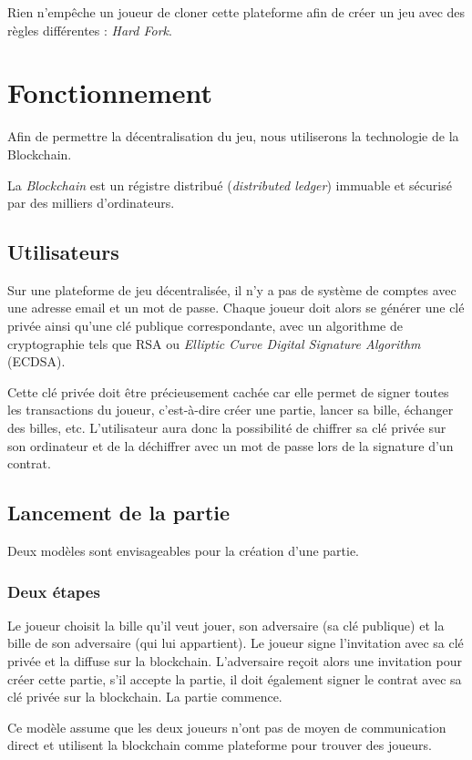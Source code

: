 \documentclass{article}
\begin{document}
Rien n'empêche un joueur de cloner cette plateforme afin de créer un jeu avec des règles différentes : \textit{Hard Fork}.

\section{Fonctionnement}
Afin de permettre la décentralisation du jeu, nous utiliserons la technologie de la Blockchain.

La \textit{Blockchain} est un régistre distribué (\textit{distributed ledger}) immuable et sécurisé par des milliers d'ordinateurs.

\subsection{Utilisateurs}
Sur une plateforme de jeu décentralisée, il n'y a pas de système de comptes avec une adresse email et un mot de passe.
Chaque joueur doit alors se générer une clé privée ainsi qu'une clé publique correspondante, avec un algorithme de cryptographie tels que RSA ou \textit{Elliptic Curve Digital Signature Algorithm} (ECDSA).

Cette clé privée doit être précieusement cachée car elle permet de signer toutes les transactions du joueur, c'est-à-dire créer une partie, lancer sa bille, échanger des billes, etc. L'utilisateur aura donc la possibilité de chiffrer sa clé privée sur son ordinateur et de la déchiffrer avec un mot de passe lors de la signature d'un contrat. 

\subsection{Lancement de la partie}
Deux modèles sont envisageables pour la création d'une partie.
\subsubsection{Deux étapes}
Le joueur choisit la bille qu'il veut jouer, son adversaire (sa clé publique) et la bille de son adversaire (qui lui appartient). Le joueur signe l'invitation avec sa clé privée et la diffuse sur la blockchain. L'adversaire reçoit alors une invitation pour créer cette partie, s'il accepte la partie, il doit également signer le contrat avec sa clé privée sur la blockchain. La partie commence.

Ce modèle assume que les deux joueurs n'ont pas de moyen de communication direct et utilisent la blockchain comme plateforme pour trouver des joueurs.
\end{document}
